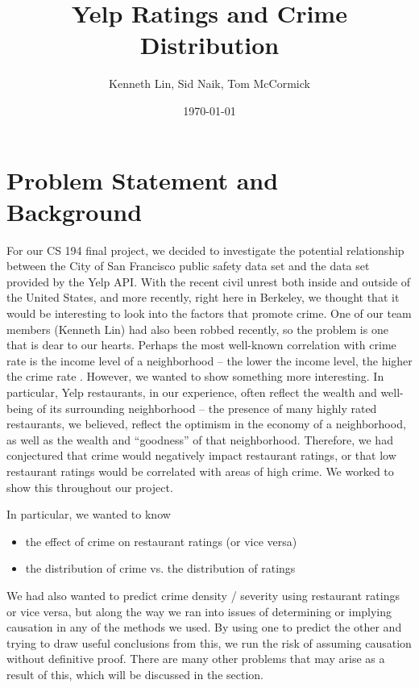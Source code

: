 \documentclass{article}
\title{Yelp Ratings and Crime Distribution}
\author{Kenneth Lin, Sid Naik, Tom McCormick}
\date{\today}
\begin{document}
\maketitle

\section{Problem Statement and Background}

For our CS 194 final project, we decided to investigate the potential
relationship between the City of San Francisco public safety data set and
the data set provided by the Yelp API. With the recent civil unrest both
inside and outside of the United States, and more recently, right here in
Berkeley, we thought that it would be interesting to look into the factors
that promote crime. One of our team members (Kenneth Lin) had also been
robbed recently, so the problem is one that is dear to our hearts. Perhaps
the most well-known correlation with crime rate is the income level of a
neighborhood -- the lower the income level, the higher the crime rate
\cite[p.93-94]{levitt-the-changing-relationship}. However, we wanted to
show something more interesting. In particular, Yelp restaurants, in our
experience, often reflect the wealth and well-being of its surrounding
neighborhood -- the presence of many highly rated restaurants, we believed,
reflect the optimism in the economy of a neighborhood, as well as the
wealth and ``goodness'' of that neighborhood. Therefore, we had conjectured
that crime would negatively impact restaurant ratings, or that low
restaurant ratings would be correlated with areas of high crime. We worked
to show this throughout our project.

In particular, we wanted to know
\begin{itemize}
\item the effect of crime on restaurant ratings (or vice versa)
\item the distribution of crime vs. the distribution of ratings
\end{itemize}

We had also wanted to predict crime density / severity using restaurant
ratings or vice versa, but along the way we ran into issues of determining
or implying causation in any of the methods we used. By using one to
predict the other and trying to draw useful conclusions from this, we run
the risk of assuming causation without definitive proof. There are many
other problems that may arise as a result of this, which will be discussed
in the \textbf{} section.
\end{document}
